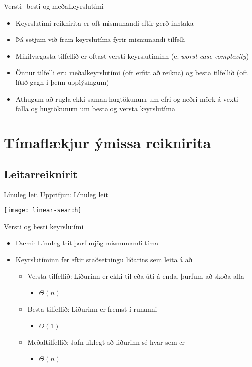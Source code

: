 \documentclass[handout]{beamer}
\begin{document}
\begin{frame}{Versti- besti og meðalkeyrslutími}
\begin{itemize}
 \item Keyrslutími reiknirita er oft mismunandi eftir gerð inntaka
 \item Þá setjum við fram keyrslutíma fyrir mismunandi tilfelli
 \item Mikilvægasta tilfellið er oftast versti keyrslutíminn (e. \emph{worst-case complexity})
 \item Önnur tilfelli eru meðalkeyrslutími (oft erfitt að reikna) og besta tilfellið (oft lítið gagn í þeim upplýsingum)
 \item Athugum að rugla ekki saman hugtökunum um efri og neðri mörk á vexti falla og hugtökunum um besta og versta keyrslutíma
\end{itemize}
\end{frame}

\section{Tímaflækjur ýmissa reiknirita}

\subsection{Leitarreiknirit}

\begin{frame}{Línuleg leit}
Upprifjun: Línuleg leit

\begin{center}
\texttt{[image: linear-search]}
\end{center}
\end{frame}

\begin{frame}{Versti og besti keyrslutími}
\begin{itemize}
 \item Dæmi: Línuleg leit þarf mjög mismunandi tíma
 \item Keyrslutíminn fer eftir staðsetningu liðarins sem leita á að
 \begin{itemize}
  \item Versta tilfellið: Liðurinn er ekki til eða úti á enda, þurfum að skoða alla \pause
  \begin{itemize}
   \item $\Theta(n)$
  \end{itemize}
  \item Besta tilfellið: Liðurinn er fremst í rununni \pause
  \begin{itemize}
   \item $\Theta(1)$
  \end{itemize}
  \item Meðaltilfellið: Jafn líklegt að liðurinn sé hvar sem er \pause
  \begin{itemize}
   \item $\Theta(n)$
  \end{itemize}
 \end{itemize}
\end{itemize}
\end{frame}
\end{document}
